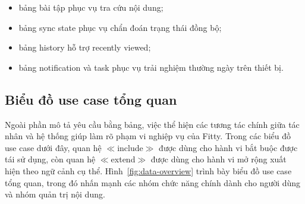 \begin{itemize}
    \item bảng bài tập phục vụ tra cứu nội dung;
    \item bảng sync state phục vụ chẩn đoán trạng thái đồng bộ;
    \item bảng history hỗ trợ recently viewed;
    \item bảng notification và task phục vụ trải nghiệm thường ngày trên thiết bị.
\end{itemize}

\subsection{Biểu đồ use case tổng quan}

Ngoài phần mô tả yêu cầu bằng bảng, việc thể hiện các tương tác chính giữa tác nhân và hệ thống giúp làm rõ phạm vi nghiệp vụ của Fitty. Trong các biểu đồ use case dưới đây, quan hệ $\ll$include$\gg$ được dùng cho hành vi bắt buộc được tái sử dụng, còn quan hệ $\ll$extend$\gg$ được dùng cho hành vi mở rộng xuất hiện theo ngữ cảnh cụ thể. Hình~\ref{fig:data-overview} trình bày biểu đồ use case tổng quan, trong đó nhấn mạnh các nhóm chức năng chính dành cho người dùng và nhóm quản trị nội dung.

